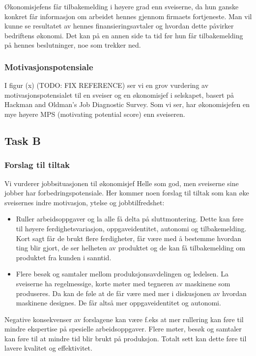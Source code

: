 Økonomisjefens får tilbakemelding i høyere grad enn sveiserne, da hun ganske konkret får informasjon om arbeidet hennes gjennom firmaets fortjeneste. Man vil kunne se resultatet av hennes finansieringsavtaler og hvordan dette påvirker bedriftens økonomi. Det kan på en annen side ta tid før hun får tilbakemelding på hennes beslutninger, noe som trekker ned.

\subsubsection{Motivasjonspotensiale}
I figur (x) (TODO: FIX REFERENCE) ser vi en grov vurdering av motivasjonspotensialet til en sveiser og en økonomisjef i selskapet, basert på Hackman and Oldman’s Job Diagnostic Survey. Som vi ser, har økonomisjefen en mye høyere MPS (motivating potential score) enn sveiseren.


\subsection{Task B}
\subsubsection{Forslag til tiltak}
Vi vurderer jobbsituasjonen til økonomisjef Helle som god, men sveiserne sine jobber har forbedringspotensiale. Her kommer noen forslag til tiltak som kan øke sveisernes indre motivasjon, ytelse og jobbtilfredshet:

\begin{itemize}
  \item Ruller arbeidsoppgaver og la alle få delta på sluttmontering. Dette kan føre til høyere ferdighetsvariasjon, oppgaveidentitet, autonomi og tilbakemelding. Kort sagt får de brukt flere ferdigheter, får være med å bestemme hvordan ting blir gjort, de ser helheten av produktet og de kan få tilbakemelding om produktet fra kunden i sanntid.
  \item Flere besøk og samtaler mellom produksjonsavdelingen og ledelsen. La sveiserne ha regelmessige, korte møter med tegneren av maskinene som produseres. Da kan de føle at de får være med mer i diskusjonen av hvordan maskinene designes. De får altså mer oppgaveidentitet og autonomi.
\end{itemize}

Negative konsekvenser av forslagene kan være f.eks at mer rullering kan føre til mindre ekspertise på spesielle arbeidsoppgaver. Flere møter, besøk og samtaler kan føre til at mindre tid blir brukt på produksjon. Totalt sett kan dette føre til lavere kvalitet og effektivitet.